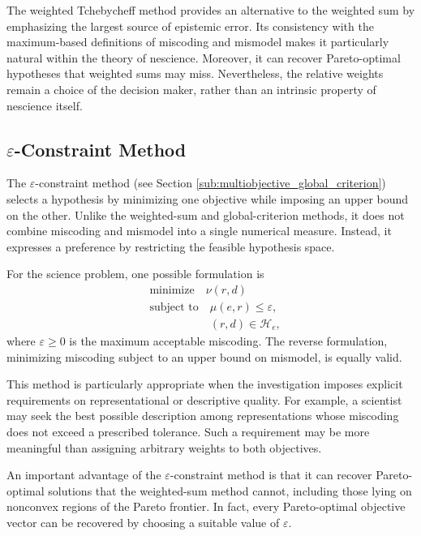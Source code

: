 The weighted Tchebycheff method provides an alternative to the weighted sum by emphasizing the largest source of epistemic error. Its consistency with the maximum-based definitions of miscoding and mismodel makes it particularly natural within the theory of nescience. Moreover, it can recover Pareto-optimal hypotheses that weighted sums may miss. Nevertheless, the relative weights remain a choice of the decision maker, rather than an intrinsic property of nescience itself.


\subsection*{$\varepsilon$-Constraint Method}

The $\varepsilon$-constraint method (see Section \ref{sub:multiobjective_global_criterion}) selects a hypothesis by minimizing one objective while imposing an upper bound on the other. Unlike the weighted-sum and global-criterion methods, it does not combine miscoding and mismodel into a single numerical measure. Instead, it expresses a preference by restricting the feasible hypothesis space.

For the science problem, one possible formulation is
\begin{align*}
& \text{minimize} \quad \nu(r,d) \\
& \text{subject to} \quad \mu(e,r)\leq\varepsilon,\\
& \phantom{\text{subject to} \quad} (r,d)\in\mathcal H_e,
\end{align*}
where $\varepsilon\geq0$ is the maximum acceptable miscoding. The reverse formulation, minimizing miscoding subject to an upper bound on mismodel, is equally valid.

This method is particularly appropriate when the investigation imposes explicit requirements on representational or descriptive quality. For example, a scientist may seek the best possible description among representations whose miscoding does not exceed a prescribed tolerance. Such a requirement may be more meaningful than assigning arbitrary weights to both objectives.

An important advantage of the $\varepsilon$-constraint method is that it can recover Pareto-optimal solutions that the weighted-sum method cannot, including those lying on nonconvex regions of the Pareto frontier. In fact, every Pareto-optimal objective vector can be recovered by choosing a suitable value of $\varepsilon$.

